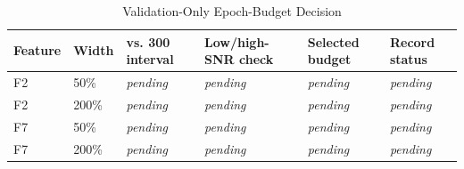\begin{table}[!t]
\caption{Validation-Only Epoch-Budget Decision}
\label{tab:epoch-budget}
\centering
\footnotesize
\begin{tabular}{@{}ll>{\centering\arraybackslash}l>{\centering\arraybackslash}l>{\centering\arraybackslash}l l@{}}
\toprule
Feature & Width & 200 vs. 300 interval & Low/high-SNR check & Selected budget & Record status \\
\midrule
F2 & 50\% & \textit{pending} & \textit{pending} & \textit{pending} & \textit{pending} \\
F2 & 200\% & \textit{pending} & \textit{pending} & \textit{pending} & \textit{pending} \\
F7 & 50\% & \textit{pending} & \textit{pending} & \textit{pending} & \textit{pending} \\
F7 & 200\% & \textit{pending} & \textit{pending} & \textit{pending} & \textit{pending} \\
\bottomrule
\end{tabular}
\end{table}
